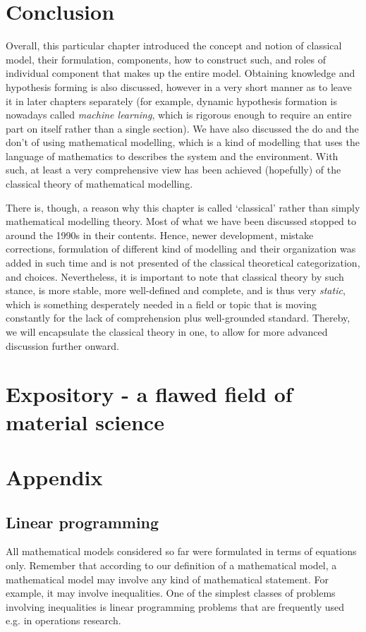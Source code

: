 \section{Conclusion}

Overall, this particular chapter introduced the concept and notion of classical model, their formulation, components, how to construct such, and roles of individual component that makes up the entire model. Obtaining knowledge and hypothesis forming is also discussed, however in a very short manner as to leave it in later chapters separately (for example, dynamic hypothesis formation is nowadays called \textit{machine learning}, which is rigorous enough to require an entire part on itself rather than a single section). We have also discussed the do and the don't of using mathematical modelling, which is a kind of modelling that uses the language of mathematics to describes the system and the environment. With such, at least a very comprehensive view has been achieved (hopefully) of the classical theory of mathematical modelling. 

There is, though, a reason why this chapter is called `classical' rather than simply mathematical modelling theory. Most of what we have been discussed stopped to around the 1990s in their contents. Hence, newer development, mistake corrections, formulation of different kind of modelling and their organization was added in such time and is not presented of the classical theoretical categorization, and choices. Nevertheless, it is important to note that classical theory by such stance, is more stable, more well-defined and complete, and is thus very \textit{static}, which is something desperately needed in a field or topic that is moving constantly for the lack of comprehension plus well-grounded standard. Thereby, we will encapsulate the classical theory in one, to allow for more advanced discussion further onward. 

\section{Expository - a flawed field of material science}



\section{Appendix}
\subsection{Linear programming}
All mathematical models considered so far were formulated in terms of equations only. Remember that according to our definition of a mathematical model, a mathematical model may involve any kind of mathematical statement. For example, it may involve inequalities. One of the simplest classes of problems involving inequalities is linear programming problems that are frequently used e.g. in operations research.

